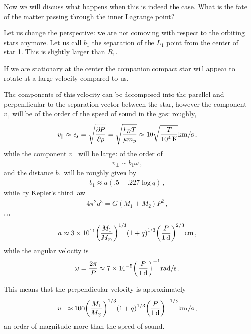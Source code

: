 \documentclass[main.tex]{subfiles}
\begin{document}
Now we will discuss what happens when this is indeed the case. What is the fate of the matter passing through the inner Lagrange point? 

Let us change the perspective: we are not comoving with respect to the orbiting stars anymore. 
Let us call \(b_1 \) the separation of the \(L_1 \) point from the center of star 1. This is slightly larger than \(R_1 \). 

If we are stationary at the center the companion compact star will appear to rotate at a large velocity compared to us. 

The components of this velocity can be decomposed into the parallel and perpendicular to the separation vector between the star, however the component \(v _ \parallel\) will be of the order of the speed of sound in the gas: roughly, 
%
\begin{align}
v_{\parallel} \approx c_s = \sqrt{ \pdv{P}{\rho }} = \sqrt{\frac{k_B T}{\mu m_p}} \approx \num{10} \sqrt{ \frac{T}{\SI{e4}{K}}} \SI{}{km /s}
\,;
\end{align}
%
while the component \(v_\perp\) will be large: of the order of 
%
\begin{align}
v_\perp \sim b_1 \omega 
\,,
\end{align}
%
and the distance \(b_1\) will be roughly given by \cite[]{plavecTablesRocheModel1964}
%
\begin{align}
b_1 \approx a (\num{.5} - \num{.227} \log q)
\,,
\end{align}
%
while by Kepler's third law 
%
\begin{align}
4 \pi^2 a^3 = G (M_1 + M_2 ) P^2
\,,
\end{align}
%
so 
%
\begin{align}
a \approx \num{3e11} \qty(\frac{M_1 }{M_{\odot}})^{1/3}
\qty(1 + q)^{1/3}
\qty(\frac{P}{\SI{1}{d}})^{2/3} 
\SI{}{cm}
\,,
\end{align}
%
while the angular velocity is 
%
\begin{align}
\omega = \frac{2 \pi }{P} \approx \num{7e-5} \qty(\frac{P}{\SI{1}{d}})^{-1} \SI{}{rad/s}
\,.
\end{align}

This means that the perpendicular velocity is approximately 
%
\begin{align}
v_{\perp} \approx \num{100} \qty(\frac{M_1 }{M_{\odot}})^{1/3}
\qty(1 + q)^{1/3}
\qty(\frac{P}{\SI{1}{d}})^{-1/3}
\SI{}{km/s}
\,,
\end{align}
%
an order of magnitude more than the speed of sound. 
\end{document}
